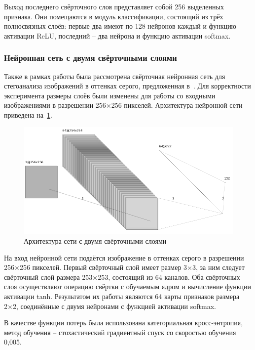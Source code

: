 Выход последнего свёрточного слоя представляет собой 256 выделенных признака. Они помещаются в модуль классификации, состоящий из трёх полносвязных слоёв: первые два имеют по 128 нейронов каждый и функцию активации ReLU, последний – два нейрона и функцию активации softmax.

\subsubsection{Нейронная сеть с двумя свёрточными слоями}
Также в рамках работы была рассмотрена свёрточная нейронная сеть для стегоанализа изображений в оттенках серого, предложенная в~\cite{FrenchCNN}. Для корректности эксперимента размеры слоёв были изменены для работы со входными изображениями в разрешении 256×256 пикселей. Архитектура нейронной сети приведена на~\ref{fig:FrenchCNNArchitecture}.

\begin{figure}[!htb]
\centering
\includegraphics[width=1\textwidth]{include/graphics/im_4-french_gray_architecture}
\caption{Архитектура сети с двумя свёрточными слоями}
\label{fig:FrenchCNNArchitecture}
\end{figure}

На вход нейронной сети подаётся изображение в оттенках серого в разрешении 256×256 пикселей. Первый свёрточный слой имеет размер 3×3, за ним следует свёрточный слой размера 253×253, состоящий из 64 каналов. Оба свёрточных слоя осуществляют операцию свёртки с обучаемым ядром и вычисление функции активации tanh. Результатом их работы являются 64 карты признаков размера 2×2, соединённые с двумя нейронами с функцией активации softmax.

В качестве функции потерь была использована категориальная кросс-энтропия, метод обучения – стохастический градиентный спуск со скоростью обучения 0,005.
\clearpage